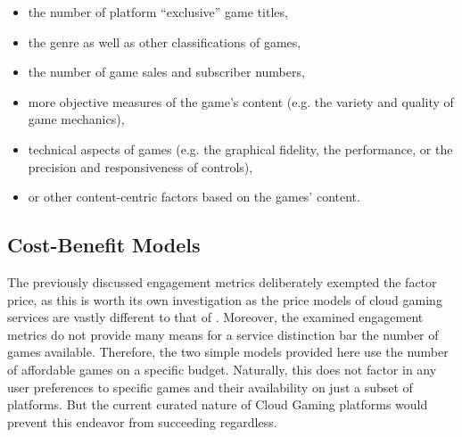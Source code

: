 \begin{itemize}
	\item the number of platform ``exclusive'' game titles,
	\item the genre as well as other classifications of games,
	\item the number of game sales and subscriber numbers,
	\item more objective measures of the game's content (e.g. the variety and quality of game mechanics),
	\item technical aspects of games (e.g. the graphical fidelity, the performance, or the precision and responsiveness of controls),
	\item or other content-centric factors based on the games' content.
\end{itemize}





%


\subsection{Cost-Benefit Models}

The previously discussed engagement metrics deliberately exempted the factor price, as this is worth its own investigation as the price models of cloud gaming services are vastly different to that of \steam. Moreover, the examined engagement metrics do not provide many means for a service distinction bar the number of games available. Therefore, the two simple models provided here use the number of affordable games on a specific budget. Naturally, this does not factor in any user preferences to specific games and their availability on just a subset of platforms. But the current curated nature of Cloud Gaming platforms would prevent this endeavor from succeeding regardless.

